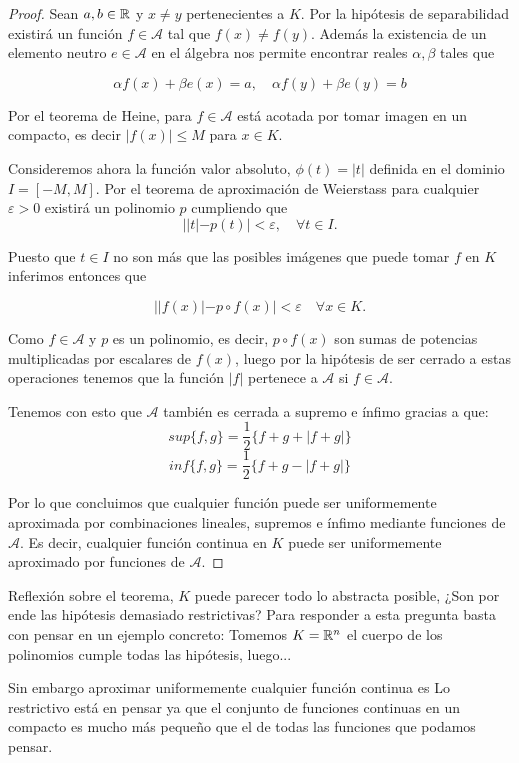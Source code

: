 \begin{proof}
    Sean $a, b \in \mathbb{R}$ y $x \neq y$ pertenecientes a $K$.  Por la hipótesis de separabilidad existirá un función $f \in \mathcal{A}$ tal que $f(x) \neq f(y)$.  Además la existencia de un elemento neutro 
    $e \in \mathcal{A}$ en el álgebra nos permite encontrar reales $\alpha, \beta$ tales que 

    $$\alpha f(x) + \beta e(x) = a, \quad \alpha f(y) + \beta e(y) = b$$  

     Por el teorema de Heine, para $f \in \mathcal A$ está acotada por tomar imagen en un compacto, es decir $|f(x)| \leq M$ para $x \in K.$  

    Consideremos ahora la función valor absoluto, $\phi(t)=|t|$ definida en el dominio $I = [-M, M].$
    Por el teorema de aproximación de Weierstass  
    para cualquier $\varepsilon > 0$ 
    existirá un polinomio $p$ cumpliendo que 
    $$||t|- p(t)| < \varepsilon, \quad \forall t \in I.$$

    Puesto que $t \in I$ no son más que las posibles imágenes que puede tomar $f$ en $K$ inferimos entonces que 

    $$||f(x)| - p \circ f(x)| < \varepsilon \quad \forall x \in K.$$

    Como $f \in \mathcal{A}$ y $p$ es un polinomio, es decir,  $p \circ f(x)$ son sumas de potencias multiplicadas por escalares de $f(x)$, luego por la hipótesis de ser cerrado a estas operaciones tenemos que la función 
    $|f|$ pertenece a $\mathcal{A}$ si $f \in \mathcal{A}.$  


    Tenemos con esto que $\mathcal{A}$ también es cerrada a supremo e ínfimo  gracias a que:   
    $$sup\{f,g\} = \frac{1}{2} \{f+g+ |f+g|\}$$
    $$inf\{f,g\} = \frac{1}{2} \{f+g -|f+g|\}$$
    
    Por lo que concluimos que cualquier función puede ser uniformemente aproximada por combinaciones lineales, supremos e ínfimo mediante funciones de $\mathcal{A}$.   Es decir, cualquier función continua en $K$
    puede ser uniformemente aproximado por funciones de $\mathcal{A}$. 
\end{proof}

Reflexión sobre el teorema, $K$ puede parecer todo lo abstracta posible, ¿Son por ende las hipótesis demasiado restrictivas?  Para responder a esta pregunta basta con pensar en un ejemplo concreto: 
Tomemos $K =  \mathbb{R}^n$  el cuerpo de los polinomios cumple todas las hipótesis, luego... 

Sin embargo aproximar uniformemente cualquier función continua es 
Lo restrictivo está en pensar ya que el conjunto de funciones continuas en un compacto es mucho  más pequeño que el de todas las funciones que podamos pensar.  

\endinput